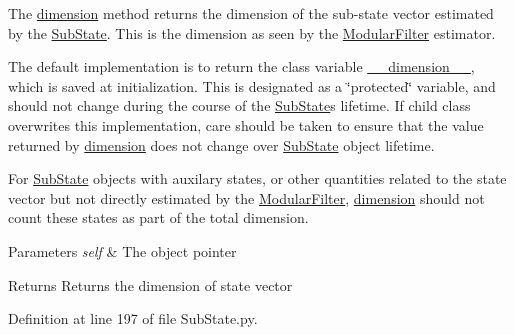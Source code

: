 The \hyperlink{classmodest_1_1substates_1_1SubState_1_1SubState_aaf7473d2ebcd61adf1b7bb2262eb31d1}{dimension} method returns the dimension of the sub-\/state vector estimated by the \hyperlink{classmodest_1_1substates_1_1SubState_1_1SubState}{Sub\+State}. This is the dimension as seen by the \hyperlink{namespacemodest_1_1ModularFilter}{Modular\+Filter} estimator.

The default implementation is to return the class variable \hyperlink{classmodest_1_1substates_1_1SubState_1_1SubState_af31a4993c39daa7aa34ef3312d41df34}{\+\_\+\+\_\+dimension\+\_\+\+\_\+}, which is saved at initialization. This is designated as a \char`\"{}protected\char`\"{} variable, and should not change during the course of the \hyperlink{classmodest_1_1substates_1_1SubState_1_1SubState}{Sub\+State}\textquotesingle{}s lifetime. If child class overwrites this implementation, care should be taken to ensure that the value returned by \hyperlink{classmodest_1_1substates_1_1SubState_1_1SubState_aaf7473d2ebcd61adf1b7bb2262eb31d1}{dimension} does not change over \hyperlink{classmodest_1_1substates_1_1SubState_1_1SubState}{Sub\+State} object lifetime.

For \hyperlink{classmodest_1_1substates_1_1SubState_1_1SubState}{Sub\+State} objects with auxilary states, or other quantities related to the state vector but not directly estimated by the \hyperlink{namespacemodest_1_1ModularFilter}{Modular\+Filter}, \hyperlink{classmodest_1_1substates_1_1SubState_1_1SubState_aaf7473d2ebcd61adf1b7bb2262eb31d1}{dimension} should not count these states as part of the total dimension.


\begin{DoxyParams}{Parameters}
{\em self} & The object pointer\\
\hline
\end{DoxyParams}
\begin{DoxyReturn}{Returns}
Returns the dimension of state vector 
\end{DoxyReturn}


Definition at line 197 of file Sub\+State.\+py.

